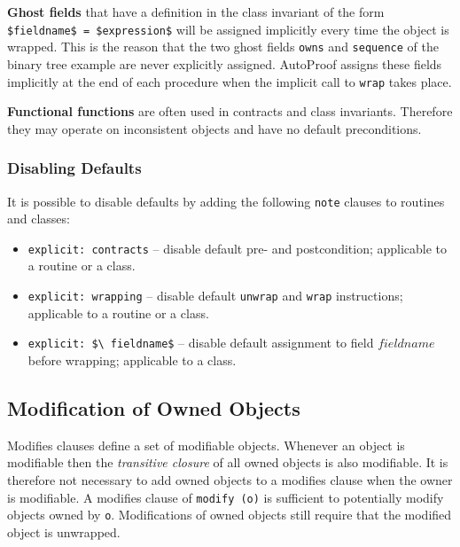 \documentclass[a4paper,12pt]{article}
\newcommand{\AutoProof}{Auto\-Proof\xspace}
\newcommand{\e}[1]{\mbox{\lstinline[language=Eiffel]|#1|}}
\begin{document}
\textbf{Ghost fields} that have a definition in the class invariant of the form \e{$fieldname$ = $expression$} will be assigned implicitly every time the object is wrapped. This is the reason that the two ghost fields \e{owns} and \e{sequence} of the binary tree example are never explicitly assigned. \AutoProof assigns these fields implicitly at the end of each procedure when the implicit call to \e{wrap} takes place.

\textbf{Functional functions} are often used in contracts and class invariants. Therefore they may operate on inconsistent objects and have no default preconditions.

\subsubsection*{Disabling Defaults}

It is possible to disable defaults by adding the following \e{note} clauses to routines and classes:
\begin{itemize}
\item \e{explicit: contracts} -- disable default pre- and postcondition; applicable to a routine or a class.
\item \e{explicit: wrapping} -- disable default \e{unwrap} and \e{wrap} instructions; applicable to a routine or a class.
\item \e{explicit: $\ fieldname$} -- disable default assignment to field $fieldname$ before wrapping; applicable to a class.
\end{itemize}

\subsection{Modification of Owned Objects}

Modifies clauses define a set of modifiable objects. Whenever an object is modifiable then the \emph{transitive closure} of all owned objects is also modifiable. It is therefore not necessary to add owned objects to a modifies clause when the owner is modifiable. A modifies clause of \e{modify (o)} is sufficient to potentially modify objects owned by \e{o}. Modifications of owned objects still require that the modified object is unwrapped.

\end{document}
